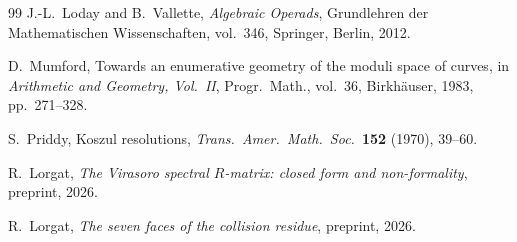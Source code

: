 \documentclass[11pt,reqno]{amsart}
\theoremstyle{definition}
\theoremstyle{remark}
\numberwithin{equation}{section}
\begin{document}
\begin{thebibliography}{99}
J.-L.~Loday and B.~Vallette,
\textit{Algebraic Operads},
Grundlehren der Mathematischen Wissenschaften, vol.~346,
Springer, Berlin, 2012.

D.~Mumford,
Towards an enumerative geometry of the moduli space of curves,
in \textit{Arithmetic and Geometry, Vol.~II},
Progr.\ Math., vol.~36, Birkh\"auser, 1983, pp.~271--328.

S.~Priddy,
Koszul resolutions,
\textit{Trans.\ Amer.\ Math.\ Soc.}~\textbf{152} (1970), 39--60.

R.~Lorgat,
\textit{The Virasoro spectral $R$-matrix: closed form and non-formality},
preprint, 2026.

R.~Lorgat,
\textit{The seven faces of the collision residue},
preprint, 2026.

\end{thebibliography}
\end{document}
